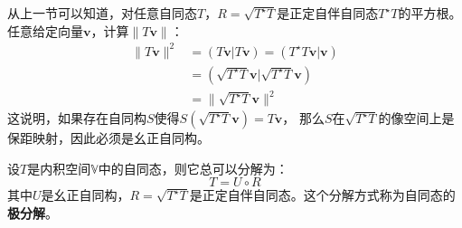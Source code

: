 \documentclass[12pt,UTF8]{ctexbook}
\begin{document}
从上一节可以知道，对任意自同态$T$，$R = \sqrt{T^\star T}$是正定自伴自同态$T^\star T$的平方根。
任意给定向量$\mathbf{v}$，计算$\|T\mathbf{v}\|$：
\begin{align*}
    \|T\mathbf{v}\|^2 &= (T\mathbf{v} | T\mathbf{v}) = (T^\star T\mathbf{v} | \mathbf{v})  \\
    &= (\sqrt{T^\star T}\mathbf{v} | \sqrt{T^\star T}\mathbf{v})  \\
    &= \| \sqrt{T^\star T} \mathbf{v}\|^2 
\end{align*}
这说明，如果存在自同构$S$使得$S(\sqrt{T^\star T} \mathbf{v}) = T\mathbf{v}$，
那么$S$在$\sqrt{T^\star T}$的像空间上是保距映射，因此必须是幺正自同构。
\begin{pp}\label{pp:8_14}
    设$T$是内积空间$\mathbb{V}$中的自同态，则它总可以分解为：
    $$ T = U \circ R$$
    其中$U$是幺正自同构，$R = \sqrt{T^\star T}$是正定自伴自同态。这个分解方式称为自同态的\textbf{极分解}。
\end{pp}
\end{document}
